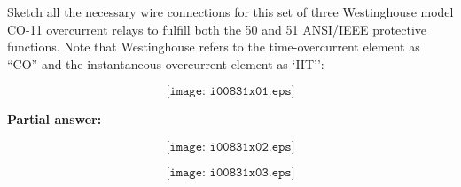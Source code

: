 

Sketch all the necessary wire connections for this set of three Westinghouse model CO-11 overcurrent relays to fulfill both the 50 and 51 ANSI/IEEE protective functions.  Note that Westinghouse refers to the time-overcurrent element as ``CO'' and the instantaneous overcurrent element as `IIT'':

$$\texttt{[image: i00831x01.eps]}$$







\noindent
{\bf Partial answer:}

$$\texttt{[image: i00831x02.eps]}$$







$$\texttt{[image: i00831x03.eps]}$$




